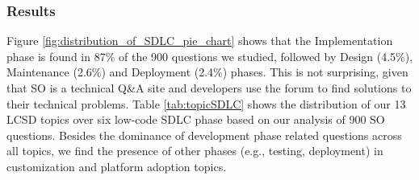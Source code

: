 \subsubsection{Results} Figure \ref{fig:distribution_of_SDLC_pie_chart} shows that the Implementation phase is found in 87\% of the 900 questions we studied, followed by Design (4.5\%), Maintenance (2.6\%) and Deployment (2.4\%) phases. This is not surprising, given that SO is a technical Q\&A site and developers use the forum to find solutions to their technical problems. Table \ref{tab:topicSDLC} shows the distribution of our 13 LCSD topics over six low-code SDLC phase based on our analysis of 900 SO questions. Besides the dominance of development phase related questions across all topics, we find the presence of other phases (e.g., testing, deployment) in customization and platform adoption topics. 




